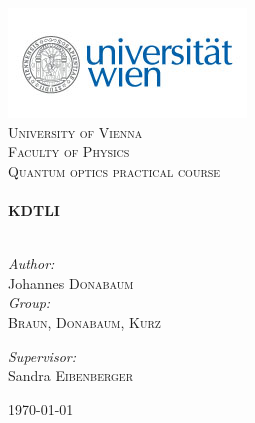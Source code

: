\begin{titlepage}
\begin{center}

\includegraphics[scale=0.75]{./unilogo}~\\[2cm]

\textsc{\LARGE University of Vienna }\\[0.5cm]
\textsc{\LARGE Faculty of Physics}\\[1.5cm]
\textsc{\Large Quantum optics practical course}\\[0.5cm]

\HRule \\[0.4cm]
{ \huge \bfseries KDTLI}\\[0.4cm]

\HRule \\[1.5cm]

\begin{minipage}{0.4\textwidth}
\begin{flushleft} \large
\emph{Author:}\\
Johannes \textsc{Donabaum}\\
\emph{Group:}\\
\textsc{Braun, Donabaum, Kurz}\\
\end{flushleft}
\end{minipage}
\begin{minipage}{0.4\textwidth}
\begin{flushright} \large
\emph{Supervisor:} \\
Sandra \textsc{Eibenberger}
\end{flushright}
\end{minipage}

\vfill

{\large \today}

\end{center}
\end{titlepage}